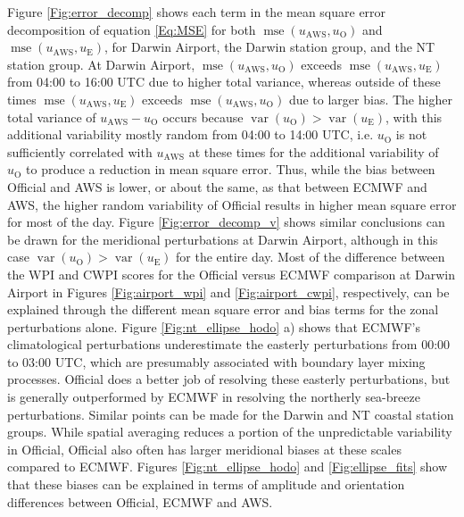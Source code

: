 \documentclass{ametsoc}
\DeclareMathOperator{\mse}{mse}
\DeclareMathOperator{\var}{var}
\begin{document}
Figure \ref{Fig:error_decomp} shows each term in the mean square error decomposition of equation \ref{Eq:MSE} for both $\mse\left(u_\text{AWS}, u_\text{O}\right)$ and $\mse\left(u_\text{AWS}, u_\text{E}\right)$, for Darwin Airport, the Darwin station group, and the NT station group. At Darwin Airport, $\mse\left(u_\text{AWS}, u_\text{O}\right)$ exceeds $\mse\left(u_\text{AWS}, u_\text{E}\right)$ from 04:00 to 16:00 UTC due to higher total variance, whereas outside of these times $\mse\left(u_\text{AWS}, u_\text{E}\right)$ exceeds $\mse\left(u_\text{AWS}, u_\text{O}\right)$ due to larger bias. The higher total variance of $u_\text{AWS} - u_\text{O}$ occurs because $\var\left(u_\text{O}\right) > \var\left(u_\text{E}\right)$, with this additional variability mostly random from 04:00 to 14:00 UTC, i.e. $u_\text{O}$ is not sufficiently correlated with $u_\text{AWS}$ at these times for the additional variability of $u_\text{O}$ to produce a reduction in mean square error. Thus, while the bias between Official and AWS is lower, or about the same, as that between ECMWF and AWS, the higher random variability of Official results in higher mean square error for most of the day. Figure \ref{Fig:error_decomp_v} shows similar conclusions can be drawn for the meridional perturbations at Darwin Airport, although in this case $\var\left(u_\text{O}\right) > \var\left(u_\text{E}\right)$ for the entire day. Most of the difference between the WPI and CWPI scores for the Official versus ECMWF comparison at Darwin Airport in Figures \ref{Fig:airport_wpi} and \ref{Fig:airport_cwpi}, respectively, can be explained through the different mean square error and bias terms for the zonal perturbations alone. Figure \ref{Fig:nt_ellipse_hodo} a) shows that ECMWF's climatological perturbations underestimate the easterly perturbations from 00:00 to 03:00 UTC, which are presumably associated with boundary layer mixing processes. Official does a better job of resolving these easterly perturbations, but is generally outperformed by ECMWF in resolving the northerly sea-breeze perturbations. Similar points can be made for the Darwin and NT coastal station groups. While spatial averaging reduces a portion of the unpredictable variability in Official, Official also often has larger meridional biases at these scales compared to ECMWF. Figures \ref{Fig:nt_ellipse_hodo} and \ref{Fig:ellipse_fits} show that these biases can be explained in terms of amplitude and orientation differences between Official, ECMWF and AWS. 
\end{document}

